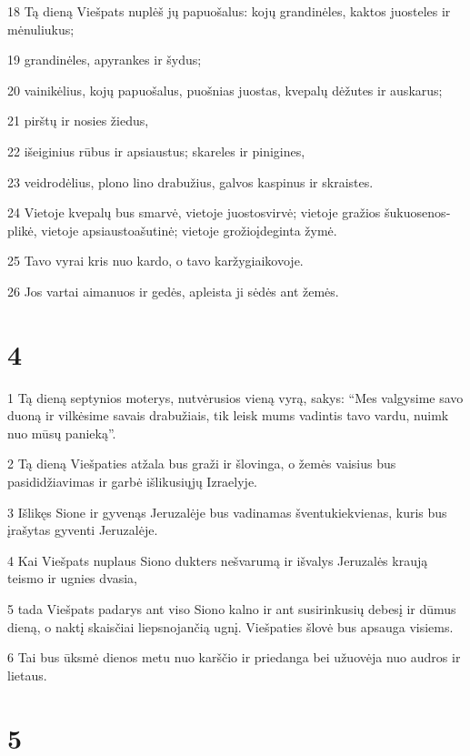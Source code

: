 \par 18 Tą dieną Viešpats nuplėš jų papuošalus: kojų grandinėles, kaktos juosteles ir mėnuliukus; 
\par 19 grandinėles, apyrankes ir šydus; 
\par 20 vainikėlius, kojų papuošalus, puošnias juostas, kvepalų dėžutes ir auskarus; 
\par 21 pirštų ir nosies žiedus, 
\par 22 išeiginius rūbus ir apsiaustus; skareles ir pinigines, 
\par 23 veidrodėlius, plono lino drabužius, galvos kaspinus ir skraistes. 
\par 24 Vietoje kvepalų bus smarvė, vietoje juostos­virvė; vietoje gražios šukuosenos­plikė, vietoje apsiausto­ašutinė; vietoje grožio­įdeginta žymė. 
\par 25 Tavo vyrai kris nuo kardo, o tavo karžygiai­kovoje. 
\par 26 Jos vartai aimanuos ir gedės, apleista ji sėdės ant žemės.



\chapter{4}


\par 1 Tą dieną septynios moterys, nutvėrusios vieną vyrą, sakys: “Mes valgysime savo duoną ir vilkėsime savais drabužiais, tik leisk mums vadintis tavo vardu, nuimk nuo mūsų panieką”. 
\par 2 Tą dieną Viešpaties atžala bus graži ir šlovinga, o žemės vaisius bus pasididžiavimas ir garbė išlikusiųjų Izraelyje. 
\par 3 Išlikęs Sione ir gyvenąs Jeruzalėje bus vadinamas šventu­kiekvienas, kuris bus įrašytas gyventi Jeruzalėje. 
\par 4 Kai Viešpats nuplaus Siono dukters nešvarumą ir išvalys Jeruzalės kraują teismo ir ugnies dvasia, 
\par 5 tada Viešpats padarys ant viso Siono kalno ir ant susirinkusių debesį ir dūmus dieną, o naktį skaisčiai liepsnojančią ugnį. Viešpaties šlovė bus apsauga visiems. 
\par 6 Tai bus ūksmė dienos metu nuo karščio ir priedanga bei užuovėja nuo audros ir lietaus.



\chapter{5}


